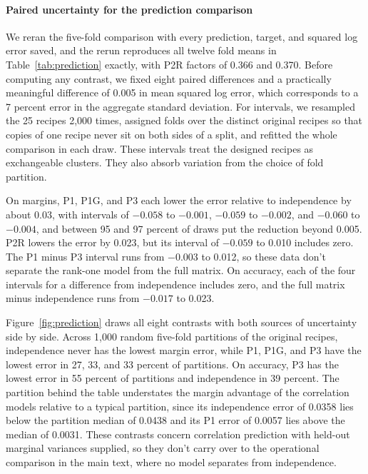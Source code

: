 \paragraph{Paired uncertainty for the prediction comparison}\label{app:paired}
We reran the five-fold comparison with every prediction, target, and squared log error saved, and the rerun reproduces all twelve fold means in Table~\ref{tab:prediction} exactly, with P2R factors of 0.366 and 0.370. Before computing any contrast, we fixed eight paired differences and a practically meaningful difference of 0.005 in mean squared log error, which corresponds to a 7 percent error in the aggregate standard deviation. For intervals, we resampled the 25 recipes 2,000 times, assigned folds over the distinct original recipes so that copies of one recipe never sit on both sides of a split, and refitted the whole comparison in each draw. These intervals treat the designed recipes as exchangeable clusters. They also absorb variation from the choice of fold partition.

On margins, P1, P1G, and P3 each lower the error relative to independence by about 0.03, with intervals of $-0.058$ to $-0.001$, $-0.059$ to $-0.002$, and $-0.060$ to $-0.004$, and between 95 and 97 percent of draws put the reduction beyond 0.005. P2R lowers the error by 0.023, but its interval of $-0.059$ to 0.010 includes zero. The P1 minus P3 interval runs from $-0.003$ to 0.012, so these data don't separate the rank-one model from the full matrix. On accuracy, each of the four intervals for a difference from independence includes zero, and the full matrix minus independence runs from $-0.017$ to 0.023.

Figure~\ref{fig:prediction} draws all eight contrasts with both sources of uncertainty side by side. Across 1,000 random five-fold partitions of the original recipes, independence never has the lowest margin error, while P1, P1G, and P3 have the lowest error in 27, 33, and 33 percent of partitions. On accuracy, P3 has the lowest error in 55 percent of partitions and independence in 39 percent. The partition behind the table understates the margin advantage of the correlation models relative to a typical partition, since its independence error of 0.0358 lies below the partition median of 0.0438 and its P1 error of 0.0057 lies above the median of 0.0031. These contrasts concern correlation prediction with held-out marginal variances supplied, so they don't carry over to the operational comparison in the main text, where no model separates from independence.

